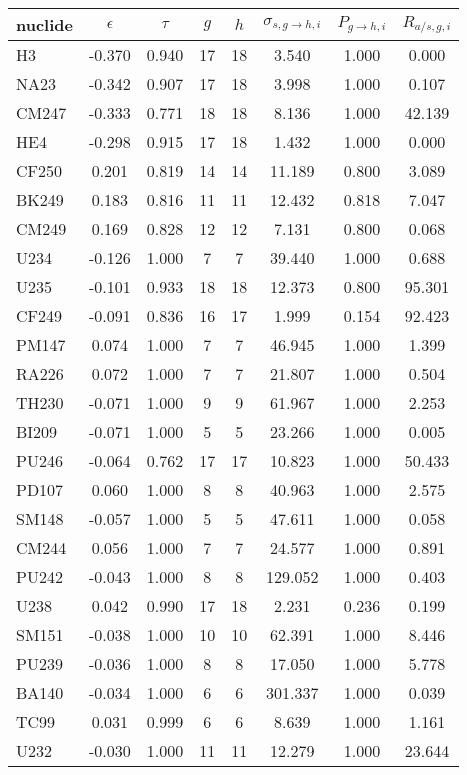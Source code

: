 \begin{tabular}{|l|ccccccc|}
\hline
nuclide & $\epsilon$ & $\tau$ & $g$ & $h$ & $\sigma_{s,g\to h,i}$ & $P_{g\to h,i}$ & $R_{a/s,g,i}$\\
\hline
H3 & -0.370 & 0.940 & 17 & 18 & 3.540 & 1.000 & 0.000\\
NA23 & -0.342 & 0.907 & 17 & 18 & 3.998 & 1.000 & 0.107\\
CM247 & -0.333 & 0.771 & 18 & 18 & 8.136 & 1.000 & 42.139\\
HE4 & -0.298 & 0.915 & 17 & 18 & 1.432 & 1.000 & 0.000\\
CF250 & 0.201 & 0.819 & 14 & 14 & 11.189 & 0.800 & 3.089\\
BK249 & 0.183 & 0.816 & 11 & 11 & 12.432 & 0.818 & 7.047\\
CM249 & 0.169 & 0.828 & 12 & 12 & 7.131 & 0.800 & 0.068\\
U234 & -0.126 & 1.000 & 7 & 7 & 39.440 & 1.000 & 0.688\\
U235 & -0.101 & 0.933 & 18 & 18 & 12.373 & 0.800 & 95.301\\
CF249 & -0.091 & 0.836 & 16 & 17 & 1.999 & 0.154 & 92.423\\
PM147 & 0.074 & 1.000 & 7 & 7 & 46.945 & 1.000 & 1.399\\
RA226 & 0.072 & 1.000 & 7 & 7 & 21.807 & 1.000 & 0.504\\
TH230 & -0.071 & 1.000 & 9 & 9 & 61.967 & 1.000 & 2.253\\
BI209 & -0.071 & 1.000 & 5 & 5 & 23.266 & 1.000 & 0.005\\
PU246 & -0.064 & 0.762 & 17 & 17 & 10.823 & 1.000 & 50.433\\
PD107 & 0.060 & 1.000 & 8 & 8 & 40.963 & 1.000 & 2.575\\
SM148 & -0.057 & 1.000 & 5 & 5 & 47.611 & 1.000 & 0.058\\
CM244 & 0.056 & 1.000 & 7 & 7 & 24.577 & 1.000 & 0.891\\
PU242 & -0.043 & 1.000 & 8 & 8 & 129.052 & 1.000 & 0.403\\
U238 & 0.042 & 0.990 & 17 & 18 & 2.231 & 0.236 & 0.199\\
SM151 & -0.038 & 1.000 & 10 & 10 & 62.391 & 1.000 & 8.446\\
PU239 & -0.036 & 1.000 & 8 & 8 & 17.050 & 1.000 & 5.778\\
BA140 & -0.034 & 1.000 & 6 & 6 & 301.337 & 1.000 & 0.039\\
TC99 & 0.031 & 0.999 & 6 & 6 & 8.639 & 1.000 & 1.161\\
U232 & -0.030 & 1.000 & 11 & 11 & 12.279 & 1.000 & 23.644\\

\end{tabular}
